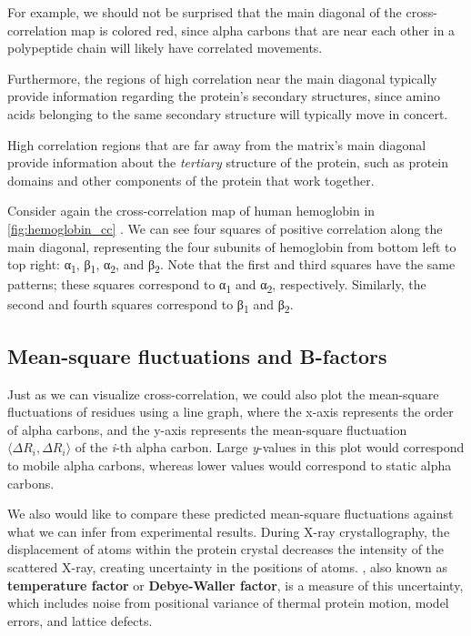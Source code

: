 For example, we should not be surprised that the main diagonal of the cross-correlation map is colored red, since alpha carbons that are near each other in a polypeptide chain will likely have correlated movements.

Furthermore, the regions of high correlation near the main diagonal typically provide information regarding the protein's secondary structures, since amino acids belonging to the same secondary structure will typically move in concert.

High correlation regions that are far away from the matrix's main diagonal provide information about the \textit{tertiary} structure of the protein, such as protein domains and other components of the protein that work together.

Consider again the cross-correlation map of human hemoglobin in \autoref{fig:hemoglobin_cc} . We can see four squares of positive correlation along the main diagonal, representing the four subunits of hemoglobin from bottom left to top right: α\textsubscript{1}, β\textsubscript{1}, α\textsubscript{2}, and β\textsubscript{2}. Note that the first and third squares have the same patterns; these squares correspond to α\textsubscript{1} and α\textsubscript{2}, respectively. Similarly, the second and fourth squares correspond to β\textsubscript{1} and β\textsubscript{2}.

\begin{qbox}\end{qbox}

\FloatBarrier
{}
\subsection{Mean-square fluctuations and B-factors}

Just as we can visualize cross-correlation, we could also plot the mean-square fluctuations of residues using a line graph, where the x-axis represents the order of alpha carbons, and the y-axis represents the mean-square fluctuation $ \langle \Delta R_i, \Delta R_i \rangle $ of the \textit{i}-th alpha carbon. Large \textit{y}-values in this plot would correspond to mobile alpha carbons, whereas lower values would correspond to static alpha carbons.

We also would like to compare these predicted mean-square fluctuations against what we can infer from experimental results. During X-ray crystallography, the displacement of atoms within the protein crystal decreases the intensity of the scattered X-ray, creating uncertainty in the positions of atoms. , also known as \textbf{temperature factor} or \textbf{Debye-Waller factor}, is a measure of this uncertainty, which includes noise from positional variance of thermal protein motion, model errors, and lattice defects.

